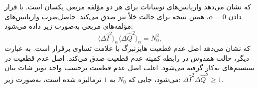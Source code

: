 که نشان می‌دهد واریانس‌های نوسانات برای هر دو مؤلفه مربعی یکسان است. با قرار دادن $\alpha = 0$، همین نتیجه برای حالت خلأ نیز صدق می‌کند. حاصل‌ضرب واریانس‌های مؤلفه‌های مربعی به‌صورت زیر داده می‌شود:
\begin{equation}
	\langle \Delta \hat{I}^2 \rangle_\alpha \langle \Delta \hat{Q}^2 \rangle_\alpha = N_0^2,
	\label{eq:7-77}
\end{equation}
که نشان می‌دهد اصل عدم قطعیت هایزنبرگ با علامت تساوی برقرار است. به عبارت دیگر، حالت همدوس در رابطه کمینه عدم قطعیت صدق می‌کند. اصل عدم قطعیت در سیستم‌های  به‌کار گرفته می‌شود. اغلب اصل عدم قطعیت برحسب واحد نویز شات بیان می‌شود، جایی که $N_0$ به $1$ نرمالیزه شده است، به‌صورت زیر: $\Delta \hat{I}^2 \Delta \hat{Q}^2 \geq 1$.






